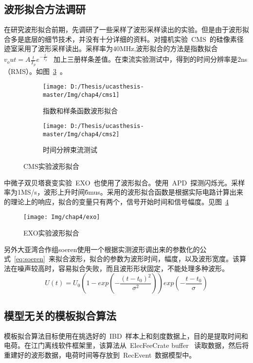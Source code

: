 \subsection{波形拟合方法调研}
在研究波形拟合前期，先调研了一些采样了波形采样读出的实验。但是由于波形拟合多是底层的细节技术，并没有十分详细的资料。对撞机实验~CMS~的硅像素径迹室采用了波形采样读出。采样率为40MHz,波形拟合的方法是指数拟合~$v_out=A\frac{t}{T_p}e^{-\frac{t}{T_p}}$~ 加上三册样条差值。在束流实验测试中，得到的时间分辨率是2ns（RMS）。如图~\ref{fig:cms}~。
\begin{figure}[!htbp]
  \centering
  \begin{subfigure}[b]{\MySubFactor\textwidth}
    \texttt{[image: D:/Thesis/ucasthesis-master/Img/chap4/cms1]}
    \caption{ 指数和样条函数波形拟合}
    \label{fig:cms_1}
  \end{subfigure}%
  \quad\quad\quad\quad\quad\quad%
  \begin{subfigure}[b]{\MySubFactor\textwidth}
    \texttt{[image: D:/Thesis/ucasthesis-master/Img/chap4/cms2]}
    \caption{ 时间分辨束流测试 }
    \label{fig:cms_2}
  \end{subfigure}
    \caption{ CMS实验波形拟合 }
  \label{fig:cms}
\end{figure}



中微子双贝塔衰变实验~EXO~也使用了波形拟合。使用~APD~探测闪烁光。采样率为1MS/s，波形上升时间\~6mus。采用的波形拟合函数是根据实际电路计算出来的理论上的响应，拟合的变量只有两个，信号开始时间和信号幅度。见图~\ref{fig:exo}~

\begin{figure}[!htbp]
  \centering
   \texttt{[image: Img/chap4/exo]}
    \caption{EXO实验波形拟合}
  \label{fig:exo}
\end{figure}


另外大亚湾合作组soeren使用一个根据实测波形调出来的参数化的公式~\ref{eq:soeren}~来拟合波形，拟合的参数为波形时间，幅度，以及波形宽度。该算法在噪声较高时，容易拟合失败，而且波形形状固定，不能处理多种波形。
\begin{equation}\label{eq:soeren}
U(t) =U_0 \left( 1 - exp(-\frac{(t-t_0)^2}{{\sigma}^2})\right)exp(-\frac{t-t_0}{\sigma})
\end{equation}
\subsection{模型无关的模板拟合算法}
模板拟合算法目标使用在挑选好的~IBD~样本上和刻度数据上，目的是提取时间和电荷。在江门离线软件框架里，该算法从~ElecFeeCrate buffer~ 读取数据，然后将重建好的波形数据，电荷时间等存放到~RecEvent~数据模型中。
